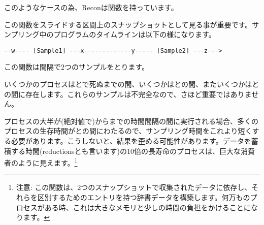 このようなケースの為、Reconは関数を持っています。

この関数をスライドする区間上のスナップショットとして見る事が重要です。サンプリング中のプログラムのタイムラインは以下の様になります。

\begin{Verbatim}
--w---- [Sample1] ---x-------------y----- [Sample2] ---z--->
\end{Verbatim}

この関数は間隔で2つのサンプルをとります。

いくつかのプロセスはとで死ぬまでの間、いくつかはとの間、またいくつかはとの間に存在します。これらのサンプルは不完全なので、さほど重要ではありません。

プロセスの大半が(絶対値で)からまでの時間間隔の間に実行される場合、多くのプロセスの生存時間がとの間にわたるので、サンプリング時間をこれより短くする必要があります。こうしないと、結果を歪める可能性があります。データを蓄積する時間(reductionsとも言います)の10倍の長寿命のプロセスは、巨大な消費者のように見えます。\footnote{注意: この関数は、2つのスナップショットで収集されたデータに依存し、それらを区別するためのエントリを持つ辞書データを構築します。何万ものプロセスがある時、これは大きなメモリと少しの時間の負担をかけることになります。}

